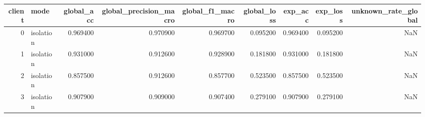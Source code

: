 \begin{tabular}{rlrrrrrrr}
\toprule
client & mode & global_acc & global_precision_macro & global_f1_macro & global_loss & exp_acc & exp_loss & unknown_rate_global \\
\midrule
0 & isolation & 0.969400 & 0.970900 & 0.969700 & 0.095200 & 0.969400 & 0.095200 & NaN \\
1 & isolation & 0.931000 & 0.912600 & 0.928900 & 0.181800 & 0.931000 & 0.181800 & NaN \\
2 & isolation & 0.857500 & 0.912600 & 0.857700 & 0.523500 & 0.857500 & 0.523500 & NaN \\
3 & isolation & 0.907900 & 0.909000 & 0.907400 & 0.279100 & 0.907900 & 0.279100 & NaN \\
\bottomrule
\end{tabular}
